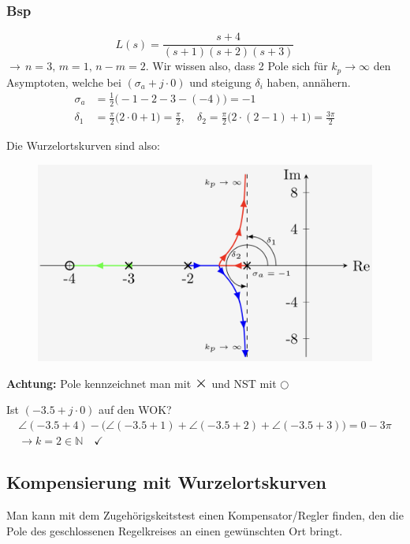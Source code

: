     \subsubsection{Bsp}
        \begin{equation*}
            L(s) = \frac{s+4}{(s+1)(s+2)(s+3)}
        \end{equation*}
        $\rightarrow\, n=3,\, m=1,\, n-m=2$. Wir wissen also, dass 2 Pole sich für $k_p \rightarrow \infty$ den Asymptoten, welche bei $(\sigma_a +j\cdot 0)$ und steigung $\delta_i$ haben, annähern.
        \begin{align*}
            \sigma_a &= \frac{1}{2}\big(-1-2-3-(-4)\big) = -1\\
            \delta_1 &= \frac{\pi}{2}\big(2\cdot0 + 1\big) = \frac{\pi}{2}, \quad \delta_2 = \frac{\pi}{2}\big(2\cdot(2-1) + 1\big) = \frac{3\pi}{2}
        \end{align*}
        
        Die Wurzelortskurven sind also:
        \begin{figure}[H]
            \centering
            \includegraphics[width= 0.6\linewidth]{images/04/RL_bsp.jpeg}
        \end{figure}
       \textbf{Achtung: } Pole kennzeichnet man mit $\mbox{\Large$\times$}$ und NST mit $\bigcirc$ 
       
       Ist $(-3.5+j\cdot0)$ auf den WOK?
       \begin{gather*}
           \angle(-3.5+4) - \big(\angle(-3.5+1) + \angle(-3.5+2) + \angle(-3.5+3)\big)= 0 - 3\pi\\ \rightarrow k = 2 \in \mathbb{N} \quad\checkmark
       \end{gather*}
       
\subsection{Kompensierung mit Wurzelortskurven}    
    Man kann mit dem Zugehörigskeitstest einen Kompensator/Regler finden, den die Pole des geschlossenen Regelkreises an einen gewünschten Ort bringt.
    
